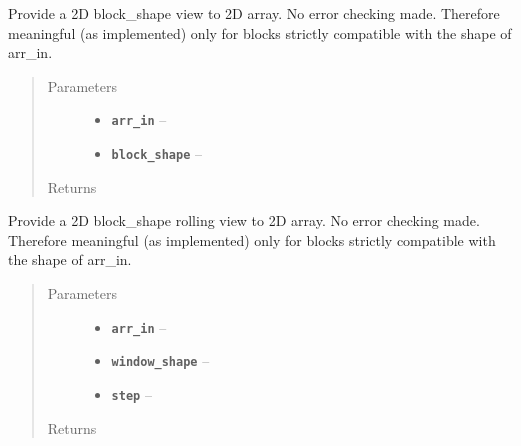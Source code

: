 \documentclass[letterpaper,10pt,english]{sphinxmanual}
\begin{document}
\begin{fulllineitems}
\label{RRtoolbox.lib.arrayops:RRtoolbox.lib.arrayops.basic.view_as_blocks}
Provide a 2D block\_shape view to 2D array. No error checking made.
Therefore meaningful (as implemented) only for blocks strictly
compatible with the shape of arr\_in.
\begin{quote}\begin{description}
\item[{Parameters}] \leavevmode\begin{itemize}
\item {} 
\textbf{\texttt{arr\_in}} -- 

\item {} 
\textbf{\texttt{block\_shape}} -- 

\end{itemize}

\item[{Returns}] \leavevmode


\end{description}\end{quote}

\end{fulllineitems}


\begin{fulllineitems}
\label{RRtoolbox.lib.arrayops:RRtoolbox.lib.arrayops.basic.view_as_windows}
Provide a 2D block\_shape rolling view to 2D array. No error checking made.
Therefore meaningful (as implemented) only for blocks strictly
compatible with the shape of arr\_in.
\begin{quote}\begin{description}
\item[{Parameters}] \leavevmode\begin{itemize}
\item {} 
\textbf{\texttt{arr\_in}} -- 

\item {} 
\textbf{\texttt{window\_shape}} -- 

\item {} 
\textbf{\texttt{step}} -- 

\end{itemize}

\item[{Returns}] \leavevmode


\end{description}\end{quote}

\end{fulllineitems}
\end{document}
